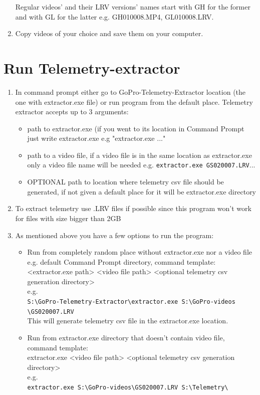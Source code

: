 \documentclass[a4paper,12pt]{book}
\begin{document}
\begin{enumerate}
Regular videos’ and their LRV versions’ names start with GH for the former and with GL for the latter e.g. GH010008.MP4, GL010008.LRV. \\
\item Copy videos of your choice and save them on your computer.
\end{enumerate}

\chapter{Run Telemetry-extractor}
\begin{enumerate}
	\item In command prompt either go to GoPro-Telemetry-Extractor location (the one with extractor.exe file) or run program from the default place. Telemetry extractor accepts up to 3 arguments:\\
	\begin{itemize}
		\item path to extractor.exe (if you went to its location in Command Prompt just write extractor.exe e.g "extractor.exe ..."
		\item path to a video file, if a video file is in the same location as extractor.exe only a video file name will be needed e.g. \verb|extractor.exe GS020007.LRV|...
		\item OPTIONAL path to location where telemetry csv file should be generated, if not given a default place for it will be extractor.exe directory
	\end{itemize}
	\item To extract telemetry use .LRV files if possible since this program won't work for files with size bigger than 2GB
	\item As mentioned above you have a few options to run the program:
	\begin{itemize}
		\item Run from completely random place without extractor.exe nor a video file e.g. default Command Prompt directory, command template: \\
		<extractor.exe path> <video file path> <optional telemetry csv generation directory>\\
		e.g.\\
		\verb|S:\GoPro-Telemetry-Extractor\extractor.exe S:\GoPro-videos|\\ \verb|\GS020007.LRV|\\
		
		This will generate telemetry csv file in the extractor.exe location.
		\item Run from extractor.exe directory that doesn't contain video file, command template:\\
		extractor.exe <video file path> <optional telemetry csv generation directory>\\
		e.g.\\
		\verb|extractor.exe S:\GoPro-videos\GS020007.LRV S:\Telemetry\|\\
		

\end{itemize}
\end{enumerate}
\end{document}

